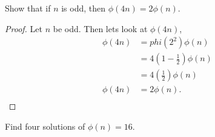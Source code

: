 \documentclass[11pt]{article}
\newenvironment{problem}[2][Problem]{\begin{trivlist}
\item[\hskip \labelsep {\bfseries #1}\hskip \labelsep {\bfseries #2.}]}{\end{trivlist}}
\begin{document}
\begin{problem}{7}
Show that if $n$ is odd, then $\phi(4n)=2\phi(n)$.
\end{problem}

\begin{proof}
    Let $n$ be odd. Then lets look at $\phi(4n)$,
    \begin{align*}
        \phi(4n) & = phi(2^2) \phi(n)                   \\
                 & = 4\left(1-\frac{1}{2}\right)\phi(n) \\
                 & = 4\left(\frac{1}{2}\right) \phi(n)  \\
        \phi(4n) & = 2\phi(n).                          \\
    \end{align*}
\end{proof}



\begin{problem}{14}
Find four solutions of $\phi(n)=16$.
\end{problem}
\end{document}
